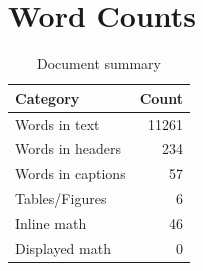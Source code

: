 
\section{Word Counts}
\begin{table}[h!]
\centering
\begin{tabular}{l r}
\textbf{Category} & \textbf{Count} \\
\hline
Words in text & 11261 \\
Words in headers & 234 \\
Words in captions & 57 \\
Tables/Figures & 6 \\
Inline math & 46 \\
Displayed math & 0 \\
\end{tabular}
\caption{Document summary}
\end{table}
